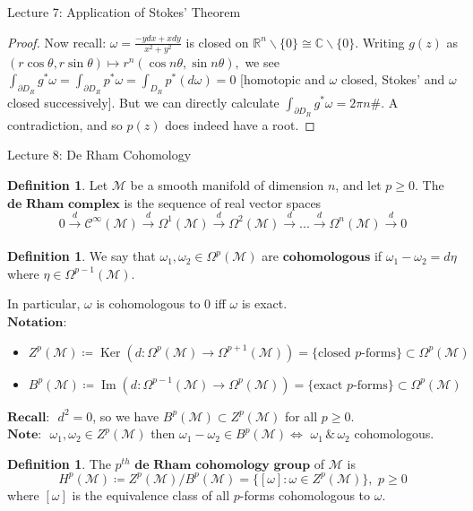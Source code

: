 \documentclass[10pt]{article}
\theoremstyle{plain}
\theoremstyle{definition}
\newtheorem{defn}[thm]{Definition} %
\newcommand{\Recall}{\textbf{Recall: }}
\newcommand{\Notation}{\textbf{Notation: }}
\newcommand{\Note}{\textbf{Note: }}
\newcommand{\Real}{\mathbb{R}}
\newcommand{\man}{\mathcal{M}}
\newcommand{\pformman}[1]{\Omega^{#1}(\man)}
\newcommand{\dx}{dx}
\newcommand{\deriv}{d}
\newcommand{\dw}{d\omega}
\newcommand{\cts}[1]{\mathcal{C}^{\infty}(#1)}
\DeclareMathOperator{\Ker}{Ker}
\DeclareMathOperator{\Ima}{Im}
\begin{document}
\begin{section}{Lecture 7: Application of Stokes' Theorem}
\begin{proof}
Now recall: $\omega = \frac{-y \dx +x dy}{x^2+y^2}$ is closed on $\Real^n\backslash \{0\} \cong \mathbb{C}\backslash \{0\}.$ Writing $g(z)$ as $(r\cos\theta,r\sin\theta) \mapsto r^n (\cos n\theta,\sin n \theta),$ we see $\int_{\partial D_R} g^* \omega = \int_{\partial D_R} p^* \omega = \int_{D_R} p^*(\dw) = 0$ [homotopic and $\omega$ closed, Stokes' and $\omega$ closed successively]. But we can directly calculate $\int_{\partial D_R} g^*\omega = 2\pi n \#$. A contradiction, and so $p(z)$ does indeed have a root.
\end{proof}
\end{section}
\begin{section}{Lecture 8: De Rham Cohomology}
\begin{defn}
Let $\man$ be a smooth manifold of dimension $n$, and let $p\geq 0$. The $\textbf{de Rham complex}$ is the sequence of real vector spaces 
$$0 \xrightarrow[]{\deriv} \cts{\man} \xrightarrow[]{\deriv} \pformman{1} \xrightarrow[]{\deriv} \pformman{2} \xrightarrow[]{\deriv} ...  \xrightarrow[]{\deriv} \pformman{n}  \xrightarrow[]{\deriv} 0$$
\end{defn}
\begin{defn}
We say that $\omega_1,\omega_2 \in \pformman{p}$ are $\textbf{cohomologous}$ if $\omega_1 -\omega_2 = \deriv\eta$ where $\eta \in \pformman{p-1}$.
\end{defn}
\noindent
In particular, $\omega$ is cohomologous to 0 iff $\omega$ is exact.\\
$\Notation$\begin{itemize}
    \item $Z^p(\man) \coloneqq \Ker(\deriv : \pformman{p} \to \pformman{p+1} ) = \{\text{closed } p \text{-forms}\} \subset \pformman{p}$
    \item $B^p(\man) \coloneqq \Ima(\deriv : \pformman{p-1} \to \pformman{p} ) = \{\text{exact } p \text{-forms}\} \subset \pformman{p}$
\end{itemize} 
$\Recall$ $\deriv^2 = 0$, so we have $B^p(\man) \subset Z^p(\man)$ for all $p\geq 0$.\\
$\Note$ $\omega_1, \omega_2 \in Z^p(\man)$ then $\omega_1-\omega_2 \in B^p(\man) \iff $ $\omega_1 \,\&\,\omega_2$ cohomologous.
\begin{defn}
The $p^{th}$ $\textbf{de Rham cohomology group}$ of $\man$ is 
$$H^p(\man) \coloneqq Z^p(\man)/B^p(\man) = \{ [\omega ] : \omega \in Z^p(\man)\}, \,\,p\geq 0$$
where $[\omega]$ is the equivalence class of all $p$-forms cohomologous to $\omega$.
\end{defn}\noindent

\end{section}
\end{document}
